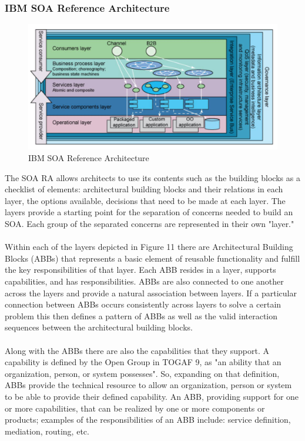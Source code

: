 \documentclass[10pt,a4paper]{article}
\begin{document}
\subsubsection{IBM SOA Reference Architecture}
\begin{figure}[h!]
 \hfill \includegraphics[width=\linewidth]{images/ibm-soa}\hspace*{\fill}
  \caption{IBM SOA Reference Architecture}
  \label{fig:imb-soa}
\end{figure}
The SOA RA allows architects to use its contents such as the building blocks as a checklist of elements: architectural building blocks and their relations in each layer, the options available, decisions that need to be made at each layer. The layers provide a starting point for the separation of concerns needed to build an SOA. Each group of the separated concerns are represented in their own "layer." \\ \\
Within each of the layers depicted in Figure 11 there are Architectural Building Blocks (ABBs) that represents a basic element of reusable functionality and fulfill the key responsibilities of that layer. Each ABB resides in a layer, supports capabilities, and has responsibilities. ABBs are also connected to one another across the layers and provide a natural association between layers. If a particular connection between ABBs occurs consistently across layers to solve a certain problem this then defines a pattern of ABBs as well as the valid interaction sequences between the architectural building blocks. \\ \\
Along with the ABBs there are also the capabilities that they support. A capability is defined by the Open Group in TOGAF 9, as "an ability that an organization, person, or system possesses". So, expanding on that definition, ABBs provide the technical resource to allow an organization, person or system to be able to provide their defined capability. An ABB, providing support for one or more capabilities, that can be realized by one or more components or products; examples of the responsibilities of an ABB include: service definition, mediation, routing, etc.
\end{document}
